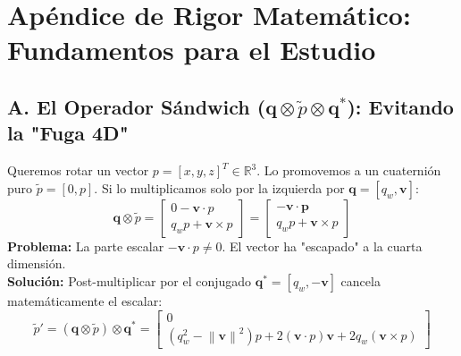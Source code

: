 \documentclass[11pt, a4paper]{article}
\begin{document}
\newpage
\section*{Apéndice de Rigor Matemático: Fundamentos para el Estudio}

\subsection*{A. El Operador Sándwich ($\mathbf{q} \otimes \tilde{p} \otimes \mathbf{q}^*$): Evitando la "Fuga 4D"}
Queremos rotar un vector $p = [x, y, z]^T \in \mathbb{R}^3$. Lo promovemos a un cuaternión puro $\tilde{p} = [0, p]$. Si lo multiplicamos solo por la izquierda por $\mathbf{q} = [q_w, \mathbf{v}]$:
\begin{equation*}
    \mathbf{q} \otimes \tilde{p} = \begin{bmatrix} 0 - \mathbf{v} \cdot p \\ q_w p + \mathbf{v} \times p \end{bmatrix} = \begin{bmatrix} \mathbf{-\mathbf{v} \cdot p} \\ q_w p + \mathbf{v} \times p \end{bmatrix}
\end{equation*}
\textbf{Problema:} La parte escalar $-\mathbf{v} \cdot p \neq 0$. El vector ha "escapado" a la cuarta dimensión.\\
\textbf{Solución:} Post-multiplicar por el conjugado $\mathbf{q}^* = [q_w, -\mathbf{v}]$ cancela matemáticamente el escalar:
\begin{equation*}
    \tilde{p}' = (\mathbf{q} \otimes \tilde{p}) \otimes \mathbf{q}^* = \begin{bmatrix} 0 \\ (q_w^2 - \left\|\mathbf{v}\right\|^2) p + 2(\mathbf{v} \cdot p)\mathbf{v} + 2 q_w (\mathbf{v} \times p) \end{bmatrix}
\end{equation*}

\begin{center}
\end{center}
\end{document}
